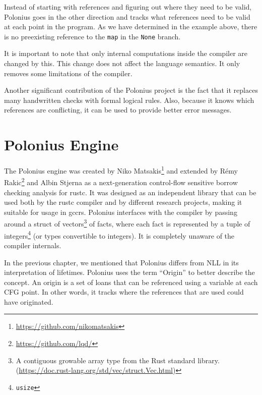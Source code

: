 \documentclass[
  11pt,
  twoside,symmetric]{report}
\DeclareRobustCommand{\href}[2]{#2\footnote{\url{#1}}}
\begin{document}
Instead of starting with references and figuring out where they need to
be valid, Polonius goes in the other direction and tracks what
references need to be valid at each point in the program. As we have
determined in the example above, there is no preexisting reference to
the \texttt{map} in the \texttt{None} branch.

It is important to note that only internal computations inside the
compiler are changed by this. This change does not affect the language
semantics. It only removes some limitations of the compiler.

Another significant contribution of the Polonius project is the fact
that it replaces many handwritten checks with formal logical rules.
Also, because it knows which references are conflicting, it can be used
to provide better error messages.

\chapter{Polonius Engine}\label{polonius-engine}

The Polonius engine was created by
\href{https://github.com/nikomatsakis}{Niko Matsakis} and extended by
\href{https://github.com/lqd/}{Rémy Rakic} and Albin
Stjerna as a next-generation
control-flow sensitive borrow checking analysis for rustc. It was
designed as an independent library that can be used both by the rustc
compiler and by different research projects, making it suitable for
usage in gccrs. Polonius interfaces with the compiler by passing around
a struct of vectors\footnote{A contiguous growable array type from the
  Rust standard library.
  (\url{https://doc.rust-lang.org/std/vec/struct.Vec.html})} of facts,
where each fact is represented by a tuple of integers\footnote{\texttt{usize}}
(or types convertible to integers). It is completely unaware of the
compiler internals.

In the previous chapter, we mentioned that Polonius differs from NLL in
its interpretation of lifetimes. Polonius uses the term ``Origin'' to
better describe the concept. An origin is a set of loans that can be
referenced using a variable at each CFG point. In other words, it tracks
where the references that are used could have originated.
\end{document}
